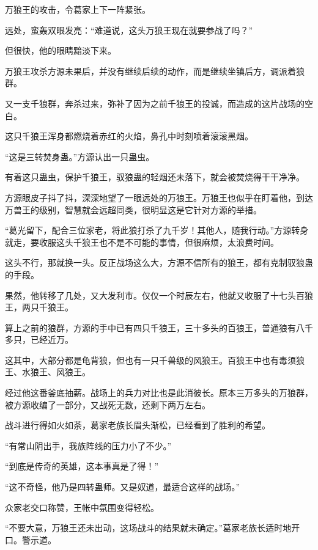 
\begin{this_body}

万狼王的攻击，令葛家上下一阵紧张。

远处，蛮轰双眼发亮：“难道说，这头万狼王现在就要参战了吗？”

但很快，他的眼睛黯淡下来。

万狼王攻杀方源未果后，并没有继续后续的动作，而是继续坐镇后方，调派着狼群。

又一支千狼群，奔杀过来，弥补了因为之前千狼王的投诚，而造成的这片战场的空白。

这只千狼王浑身都燃烧着赤红的火焰，鼻孔中时刻喷着滚滚黑烟。

“这是三转焚身蛊。”方源认出一只蛊虫。

有着这只蛊虫，保护千狼王，驭狼蛊的轻烟还未落下，就会被焚烧得干干净净。

方源眼皮子抖了抖，深深地望了一眼远处的万狼王。万狼王也似乎在盯着他，到达万兽王的级别，智慧就会远超同类，很明显这是它针对方源的举措。

“葛光留下，配合三位家老，将此狼打杀了九千岁！其他人，随我行动。”方源转身就走，要收服这头千狼王也不是不可能的事情，但很麻烦，太浪费时间。

这头不行，那就换一头。反正战场这么大，方源不信所有的狼王，都有克制驭狼蛊的手段。

果然，他转移了几处，又大发利市。仅仅一个时辰左右，他就又收服了十七头百狼王，两只千狼王。

算上之前的狼群，方源的手中已有四只千狼王，三十多头的百狼王，普通狼有八千多只，已经近万。

这其中，大部分都是龟背狼，但也有一只千兽级的风狼王。百狼王中也有毒须狼王、水狼王、风狼王。

经过他这番釜底抽薪。战场上的兵力对比也是此消彼长。原本三万多头的万狼群，被方源收编了一部分，又战死无数，还剩下两万左右。

战斗进行得如火如荼，葛家老族长眉头渐松，已经看到了胜利的希望。

“有常山阴出手，我族阵线的压力小了不少。”

“到底是传奇的英雄，这本事真是了得！”

“这不奇怪，他乃是四转蛊师。又是奴道，最适合这样的战场。”

众家老交口称赞，王帐中氛围变得轻松。

“不要大意，万狼王还未出动，这场战斗的结果就未确定。”葛家老族长适时地开口。警示道。


\end{this_body}
